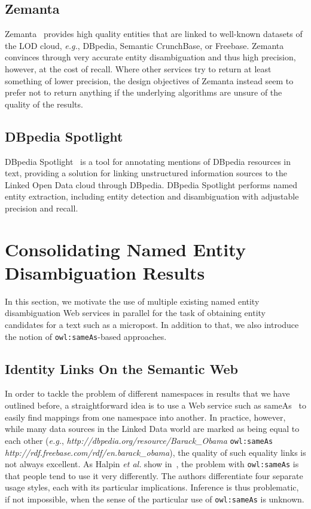 \documentclass[twocolumn]{article}
\begin{document}
\subsection{Zemanta}
Zemanta~\cite{Zemanta} provides high quality entities that are linked to well-known datasets of the LOD cloud, \emph{e.g.}, DBpedia, Semantic CrunchBase, or Freebase. Zemanta convinces through very accurate entity disambiguation and thus high precision, however, at the cost of recall. Where other services try to return at least something of lower precision, the design objectives of Zemanta instead seem to prefer not to return anything if the underlying algorithms are unsure of the quality of the results. 

\subsection{DBpedia Spotlight}
DBpedia Spotlight~\cite{spotlight} is a tool for annotating mentions of DBpedia resources in text, providing a solution for linking unstructured information sources to the Linked Open Data cloud through DBpedia. DBpedia Spotlight performs named entity extraction, including entity detection and disambiguation with adjustable precision and recall.

\section{Consolidating Named Entity Disambiguation Results} \label{sec:consolidate}
In this section, we motivate the use of multiple existing named entity disambiguation Web services in parallel for the task of
obtaining entity candidates for a text such as a micropost. In addition to that, we also introduce the notion of
\texttt{owl:sameAs}-based approaches.

\subsection{Identity Links On the Semantic Web}                             \label{sec:sameasorg}
In order to tackle the problem of different namespaces in results that we have outlined before, a straightforward idea is to use a Web service such as
sameAs~\cite{Glaser:SameAs} to easily find mappings from one namespace into another. In practice,
however, while many data sources in the Linked Data world are marked as being equal to each other (\emph{e.g.},
\textit{http://dbpedia.org/resource/Barack\_Obama} \texttt{owl:sameAs} \textit{http://rdf.freebase.com/rdf/en.barack\_obama}),
the quality of such equality links is not always excellent. As Halpin \emph{et al.} show in~\cite{Halpin:SameAs}, the problem
with \texttt{owl:sameAs} is that people tend to use it very differently. The authors 
differentiate four separate usage styles, each with its particular implications. Inference is thus problematic, if not
impossible, when the sense of the particular use of \texttt{owl:sameAs} is unknown.
\end{document}
